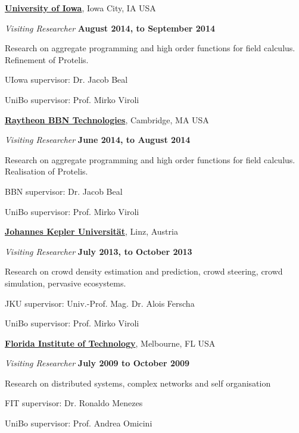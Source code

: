\documentclass[10pt]{article}
\newenvironment{outerlist}[1][\enskip\textbullet]%
        {\begin{itemize}[#1]}{\end{itemize}%
         \vspace{-.6\baselineskip}}
\newenvironment{innerlist}[1][\enskip\textbullet]%
        {\begin{compactitem}[#1]}{\end{compactitem}}
\newcommand{\halfblankline}{\quad\vspace{-0.5\baselineskip}\pagebreak[3]}
\begin{document}
\href{http://www.uiowa.edu/}{\textbf{University of Iowa}}, Iowa City, IA USA
\begin{outerlist}
\item[] \textit{Visiting Researcher} \hfill \textbf{August 2014, to September 2014}
    \begin{innerlist}
      \item Research on aggregate programming and high order functions for field calculus. Refinement of Protelis.
      \item UIowa supervisor: Dr. Jacob Beal
      \item UniBo supervisor: Prof. Mirko Viroli
    \end{innerlist}
\halfblankline
\end{outerlist}

\href{http://www.bbn.com/}{\textbf{Raytheon BBN Technologies}}, Cambridge, MA USA
\begin{outerlist}
\item[] \textit{Visiting Researcher} \hfill \textbf{June 2014, to August 2014}
    \begin{innerlist}
      \item Research on aggregate programming and high order functions for field calculus. Realisation of Protelis.
      \item BBN supervisor: Dr. Jacob Beal
      \item UniBo supervisor: Prof. Mirko Viroli
    \end{innerlist}
\halfblankline
\end{outerlist}

\href{http://www.jku.at/}{\textbf{Johannes Kepler Universität}}, Linz, Austria
\begin{outerlist}
\item[] \textit{Visiting Researcher} \hfill \textbf{July 2013, to October 2013}
    \begin{innerlist}
      \item Research on crowd density estimation and prediction, crowd steering, crowd simulation, pervasive ecosystems.
      \item JKU supervisor: Univ.-Prof. Mag. Dr. Alois Ferscha
      \item UniBo supervisor: Prof. Mirko Viroli
    \end{innerlist}
\halfblankline
\end{outerlist}

\href{http://www.fit.edu/}{\textbf{Florida Institute of Technology}}, Melbourne, FL USA
\begin{outerlist}
\item[] \textit{Visiting Researcher} \hfill \textbf{July 2009 to October 2009}
    \begin{innerlist}
      \item Research on distributed systems, complex networks and self organisation
      \item FIT supervisor: Dr. Ronaldo Menezes
      \item UniBo supervisor: Prof. Andrea Omicini
    \end{innerlist}
\halfblankline
\end{outerlist}
\end{document}
